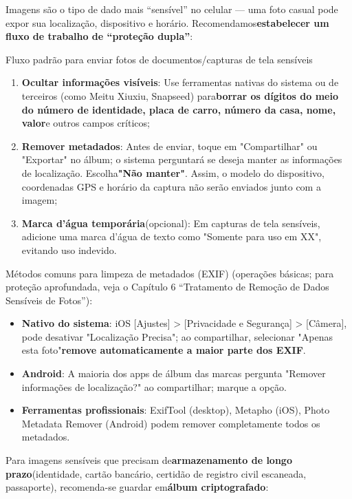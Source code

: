 
Imagens são o tipo de dado mais “sensível” no celular — uma foto casual pode expor sua localização, dispositivo e horário. Recomendamos\textbf{estabelecer um fluxo de trabalho de “proteção dupla”}:

\begin{tcbwarn}{Fluxo padrão para enviar fotos de documentos/capturas de tela sensíveis}
\begin{enumerate}
  \item \textbf{Ocultar informações visíveis}: Use ferramentas nativas do sistema ou de terceiros (como Meitu Xiuxiu, Snapseed) para\textbf{borrar os dígitos do meio do número de identidade, placa de carro, número da casa, nome, valor}e outros campos críticos;
  \item \textbf{Remover metadados}: Antes de enviar, toque em "Compartilhar" ou "Exportar" no álbum; o sistema perguntará se deseja manter as informações de localização. Escolha\textbf{"Não manter"}. Assim, o modelo do dispositivo, coordenadas GPS e horário da captura não serão enviados junto com a imagem;
  \item \textbf{Marca d'água temporária}(opcional): Em capturas de tela sensíveis, adicione uma marca d'água de texto como "Somente para uso em XX", evitando uso indevido.
\end{enumerate}

\end{tcbwarn}

Métodos comuns para limpeza de metadados (EXIF) (operações básicas; para proteção aprofundada, veja o Capítulo 6 “Tratamento de Remoção de Dados Sensíveis de Fotos”):

\begin{itemize}
  \item \textbf{Nativo do sistema}: iOS [Ajustes] > [Privacidade e Segurança] > [Câmera], pode desativar "Localização Precisa"; ao compartilhar, selecionar "Apenas esta foto"\textbf{remove automaticamente a maior parte dos EXIF}.
  \item \textbf{Android}: A maioria dos apps de álbum das marcas pergunta "Remover informações de localização?" ao compartilhar; marque a opção.
  \item \textbf{Ferramentas profissionais}: ExifTool (desktop), Metapho (iOS), Photo Metadata Remover (Android) podem remover completamente todos os metadados.
\end{itemize}

Para imagens sensíveis que precisam de\textbf{armazenamento de longo prazo}(identidade, cartão bancário, certidão de registro civil escaneada, passaporte), recomenda-se guardar em\textbf{álbum criptografado}:

